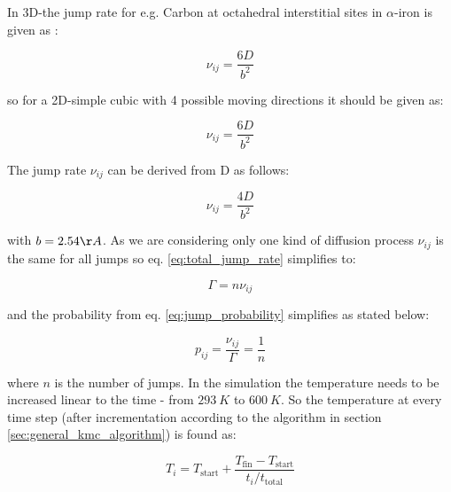 In 3D-the jump rate for e.g. Carbon at octahedral interstitial sites in $\alpha$-iron is given as \cite{gottstein2004}:

\begin{equation}
	\nu_{ij} = \frac{6D}{b^{2}}
\end{equation}

so for a 2D-simple cubic with 4 possible moving directions it should be given as:

\begin{equation}
	\nu_{ij} = \frac{6D}{b^{2}}
\end{equation}

The jump rate \(\nu_{ij}\) can be derived from D as follows:

\begin{equation}
	\nu_{ij} = \frac{4D}{b^{2}}
\end{equation}

with \(b = 2.54 \AA \). As we are considering only one kind of diffusion process \(\nu_{ij}\) is the same for all jumps so eq. \ref{eq:total_jump_rate} simplifies to:

\begin{equation}
	\Gamma = n \nu_{ij}
\end{equation}

and the probability from eq. \ref{eq:jump_probability} simplifies as stated below:

\begin{equation}
	p_{ij} = \frac{\nu_{ij}}{\Gamma} = \frac{1}{n}
\end{equation}

where \(n\) is the number of jumps. In the simulation the temperature needs to be increased linear to the time - from \(293~K\) to \(600~K\). So the temperature at every time step (after incrementation according to the algorithm in section \ref{sec:general_kmc_algorithm}) is found as:

\begin{equation}
	T_{i} = T_{\mathrm{start}} + \frac{T_{\mathrm{fin}} - T_{\mathrm{start}}}{t_{i}/t_{\mathrm{total}}}
\end{equation}

